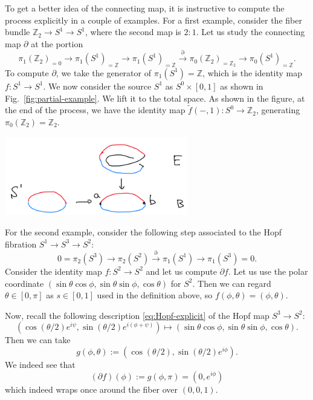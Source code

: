 \documentclass[12pt]{article}
\numberwithin{equation}{section}
\theoremstyle{remark}
\renewenvironment{figure}[1][]{
  \begin{originalfigure}[#1]
    \begin{mdframed}[linecolor=black!0,backgroundcolor=black!1]
}{
    \end{mdframed}
  \end{originalfigure}
}
\def\bZ{\mathbb{Z}}
\begin{document}
To get a better idea of the connecting map, it is instructive 
to compute the process explicitly in a couple of examples.
For a first example, consider the fiber bundle $\bZ_2 \to S^1 \to S^1$,
where the second map is $2:1$. 
Let us study the connecting map $\partial$ at the portion \begin{equation}
  \pi_1(\bZ_2)_{=0}\to \pi_1(S^1)_{=\bZ} \to \pi_1(S^1)_{=\bZ} \stackrel{\partial}{\longrightarrow} \pi_0(\bZ_2)_{=\bZ_2} \to \pi_0(S^1)_{=\bZ}.
\end{equation}
To compute $\partial$, we take the generator of $\pi_{1}(S^1)=\bZ$,
which is the identity map $f:S^1\to S^1$.
We now consider the source $S^1$ as $S^0 \times [0,1]$ as shown in Fig.~\ref{fig:partial-example}.
We lift it to the total space.
As shown in the figure,
at the end of the process, we have the identity map $\tilde f(-,1): S^0\to \bZ_2$, generating $\pi_0(\bZ_2)=\bZ_2$.
\begin{figure}
  \centering
  \includegraphics[width=0.6\textwidth]{partial-example}
  \caption{An illustration of the connecting map $\partial$ for the fiber bundle $\bZ_2\to S^1\to S^1$.}
  \label{fig:partial-example}
\end{figure}

For the second example, consider the following step
associated to the Hopf fibration $S^1\to S^3\to S^2$: \begin{equation}
0= \pi_2(S^3) \to \pi_2(S^2) \stackrel{\partial}{\longrightarrow} \pi_1(S^1) \to \pi_1(S^3)=0.
\end{equation}
Consider the identity map $f:S^2\to S^2$ and let us compute $\partial f$.
Let us use the polar coordinate $(\sin\theta\cos\phi,\sin\theta\sin\phi,\cos\theta)$ for $S^2$.
Then we can regard $\theta\in [0,\pi]$ as $s\in[0,1]$ used in the definition above, so $f(\phi,\theta)=(\phi,\theta)$.

Now, recall the following description \eqref{eq:Hopf-explicit} of the Hopf map $S^3\to S^2$:\begin{equation}
  (\cos(\theta/2)  e^{i \psi},
  \sin(\theta/2) e^{i(\phi+\psi)} )
  \mapsto  (\sin\theta\cos\phi,\sin\theta\sin\phi,\cos\theta).
\end{equation}
Then we can take \begin{equation}
g(\phi,\theta) := (\cos(\theta/2),\sin(\theta/2)e^{i\phi}).
\end{equation}
We indeed see that \begin{equation}
(\partial f)(\phi):= g(\phi,\pi) = (0,e^{i\phi})
\end{equation} which indeed wraps once around the fiber over $(0,0,1)$.
\end{document}

